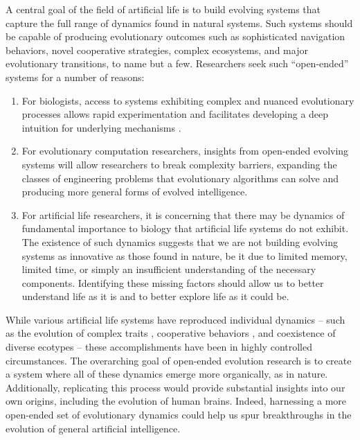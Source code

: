 \documentclass[letterpaper]{article}
\begin{document}
A central goal of the field of artificial life is to build evolving systems that capture the full range of dynamics found in natural systems. Such systems should be capable of producing evolutionary outcomes such as sophisticated navigation behaviors, novel cooperative strategies, complex ecosystems, and major evolutionary transitions, to name but a few. Researchers seek such ``open-ended'' systems for a number of reasons:
\begin{enumerate}

\item For biologists, access to systems exhibiting complex and nuanced evolutionary processes allows rapid experimentation and facilitates developing a deep intuition for underlying mechanisms \citep{tenaillon_tempo_2016}.

\item For evolutionary computation researchers, insights from open-ended evolving systems will allow researchers to break complexity barriers, expanding the classes of engineering problems that evolutionary algorithms can solve \citep{hara_emergence_1999, potter_cooperative_2000} and producing more general forms of evolved intelligence.

\item For artificial life researchers, it is concerning that there may be dynamics of fundamental importance to biology that artificial life systems do not exhibit. The existence of such dynamics suggests that we are not building evolving systems as innovative as those found in nature, be it due to limited memory, limited time, or simply an insufficient understanding of the necessary components.
Identifying these missing factors should allow us to better understand life as it is and to better explore life as it could be.

\end{enumerate}

While various artificial life systems have reproduced individual dynamics -- such as the evolution of complex traits \citep{lenski_evolutionary_2003}, cooperative behaviors \citep{goldsby_task-switching_2012}, and coexistence of diverse ecotypes \citep{cooper_evolution_2003} -- these accomplishments have been in highly controlled circumstances. The overarching goal of open-ended evolution research is to create a system where all of these dynamics emerge more organically, as in nature. 
Additionally, replicating this process would provide substantial insights into our own origins, including the evolution of human brains. Indeed, harnessing a more open-ended set of evolutionary dynamics could help us spur breakthroughs in the evolution of general artificial intelligence.
\end{document}
